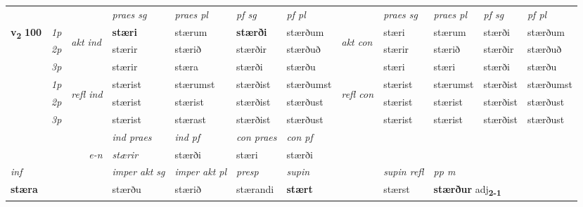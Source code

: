 \begin{longtable}[l]{X>{\footnotesize\itshape}llXXXXlXXXX}
 \midrule
 & &   & \textit{praes sg}  & \textit{praes pl}    & \textit{ pf sg} & \textit{pf pl} & & \textit{praes sg}  & \textit{praes pl}    & \textit{pf sg} & \textit{pf pl }  \\ \cmidrule{4-7} \cmidrule{9-12}
 \multirow{2}{*}{{{\textbf{v{\textsubscript{2}}} \Large{\textbf{100}}}}}  & 1p & \multirow{3}{*}{\begin{turn}{90}\textit{akt ind}\end{turn}} & \textbf{stæri} & stærum & \textbf{stærði} & stærðum & \multirow{3}{*}{\begin{turn}{90}\textit{akt con}\end{turn}} &stæri & stærum & stærði & stærðum\\*
 & 2p &  &  stærir  & stærið & stærðir & stærðuð & & stærir & stærið & stærðir & stærðuð \\*
 & 3p &  & stærir & stæra & stærði & stærðu & & stæri & stæri& stærði & stærðu \\*
\cmidrule{4-7} \cmidrule{9-12}
 & 1p & \multirow{3}{*}{\begin{turn}{90}\textit{refl ind}\end{turn}}  & stærist & stærumst & stærðist & stærðumst & \multirow{3}{*}{\begin{turn}{90}\textit{refl con}\end{turn}}  &stærist & stærumst & stærðist & stærðumst \\*
 & 2p &  & stærist & stærist & stærðist & stærðust & &stærist & stærist & stærðist & stærðust \\*
 & 3p  & & stærist & stærast & stærðist & stærðust & & stærist & stærist& stærðist & stærðust \\*
\cmidrule{4-7} \cmidrule{9-12}

   && &  \textit{ind praes} & \textit{ind pf} & \textit{con praes} & \textit{con pf} \\*
\multicolumn{3}{r}{\textit{e-n}} & stærir & stærði & stæri & stærði \\*

\cmidrule{4-7}
   {\textit{inf}} & &  & \textit{imper akt sg} & \textit{imper akt pl}   & \textit{presp} & \textit{supin} && \textit{supin refl} & \textit{pp m} \\*
  {\textbf{stæra}} & && stærðu  & stærið   & stærandi &  \textbf{stært} && stærst & \multicolumn{2}{l}{\textbf{stærður} adj\textbf{\textsubscript{2-1}}} \\*

\midrule


\end{longtable}
